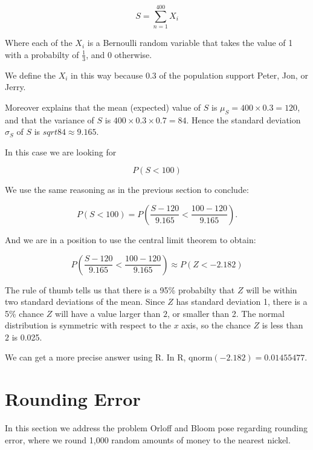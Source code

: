 \documentclass[a5paper,11pt]{article}
\begin{document}
\begin{equation}
S = \sum_{n=1}^{400} X_i 
\end{equation}

Where each of the $X_i$ is a Bernoulli
random variable that takes the value of
1 with a probabilty of $\frac{1}{3}$,
and 0 otherwise.

We define the $X_i$ in this way because
$0.3$ of the population support Peter,
Jon, or Jerry. 

Moreover \cite{reading5a} explains that
the mean (expected) value of $S$ is 
$\mu_S = 400 \times 0.3 = 120$, and that
the variance of $S$ is
$400 \times 0.3 \times 0.7 = 84$.
Hence the standard deviation $\sigma_S$ of 
$S$ is $sqrt{84} \approx 9.165$.


In this case we are looking for

\begin{equation}
P\left(S < 100\right)
\end{equation}

We use the same reasoning as in the
previous section to conclude:

\begin{equation}
P\left(S < 100\right) =
P\left(\frac{S-120}{9.165} < 
\frac{100-120}{9.165} \right).
\end{equation}

And we are in a position to use the central
limit theorem to obtain:

\begin{equation}
P\left(\frac{S-120}{9.165} < 
\frac{100-120}{9.165} \right) \approx
P\left(Z < -2.182 \right)
\end{equation}

The rule of thumb \cite{reading6b} tells us
that there is a 95\% probabilty that $Z$
will be within two standard deviations of
the mean. Since $Z$ has standard deviation
1, there is a 5\% chance $Z$ will have a
value larger than $2$, or smaller than 2.
The normal distribution is symmetric
with respect to the $x$ axis, so the chance
$Z$ is less than $2$ is 0.025.

We can get a more precise answer using R.
In R, qnorm$\left( -2.182 \right) = 
0.01455477$.

\section{Rounding Error}
In this section we address the problem
Orloff and Bloom pose regarding rounding
error, where we round 1,000 random amounts
of money to the nearest nickel.
\end{document}
